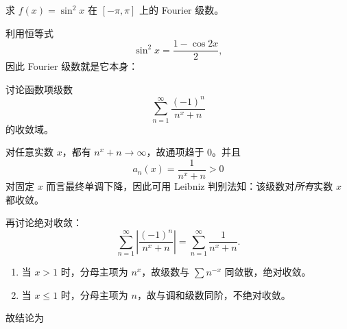 \begin{question}[Fourier 级数]

求 $f(x)=\sin^2x$ 在 $[-\pi,\pi]$ 上的 Fourier 级数。

\begin{solution}

利用恒等式
\[
\sin^2x=\frac{1-\cos 2x}{2},
\]
因此 Fourier 级数就是它本身：

\end{solution}
\end{question}

\begin{question}[参数型级数的收敛域]

讨论函数项级数
\[
\sum_{n=1}^{\infty}\frac{(-1)^n}{n^x+n}
\]
的收敛域。

\begin{solution}

对任意实数 $x$，都有 $n^x+n\to\infty$，故通项趋于 $0$。并且
\[
 a_n(x)=\frac{1}{n^x+n}>0
\]
对固定 $x$ 而言最终单调下降，因此可用 Leibniz 判别法知：该级数对\emph{所有}实数 $x$ 都收敛。

再讨论绝对收敛：
\[
\sum_{n=1}^{\infty}\left|\frac{(-1)^n}{n^x+n}\right|
=\sum_{n=1}^{\infty}\frac{1}{n^x+n}.
\]
\begin{enumerate}[label=(\arabic*),leftmargin=2.6em,itemsep=0.25em,topsep=0.2em]
\item 当 $x>1$ 时，分母主项为 $n^x$，故级数与 $\sum n^{-x}$ 同敛散，绝对收敛。
\item 当 $x\le 1$ 时，分母主项为 $n$，故与调和级数同阶，不绝对收敛。
\end{enumerate}
故结论为

\end{solution}
\end{question}

